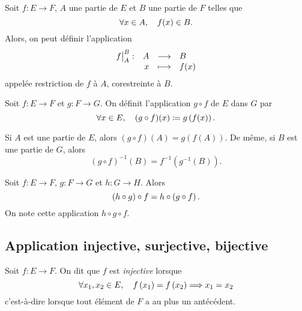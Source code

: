\documentclass{magnolia}
\begin{document}
\begin{remarqueUnique}
\remarque Soit $f:E\to F$, $A$ une partie de $E$ et $B$ une partie de $F$
  telles que
  \[\forall x\in A,\quad f(x)\in B.\]
  Alors, on peut définir l'application
  \[\dspappli{\restricorestri{f}{A}{B}}{A}{B}{x}{f(x)}\]
  appelée restriction de $f$ à $A$, corestreinte à $B$.
\end{remarqueUnique}



\begin{definition}[utile=-3]
Soit $f:E\to F$ et $g:F\to G$. On définit l'application $g\circ f$ de $E$ dans $G$ par
\[\forall x\in E,\quad (g\circ f)(x)\coloneqq g\left(f(x)\right).\]
\end{definition}

\begin{remarqueUnique}
\remarque Si $A$ est une partie de $E$, alors $(g\circ f)(A)=g(f(A))$. De même, si
  $B$ est une partie de $G$, alors \[(g\circ f)^{-1}(B)=f^{-1}(g^{-1}(B)).\]
\end{remarqueUnique}


\begin{proposition}[utile=-3]
Soit $f:E\to F$, $g:F\to G$ et $h:G\to H$. Alors
\[\left(h\circ g\right)\circ f=h\circ\left(g\circ f\right).\]
On note cette application $h\circ g\circ f$.
\end{proposition}

\subsection{Application injective, surjective, bijective}

\begin{definition}[utile=-3]
Soit $f:E\to F$. On dit que $f$ est \emph{injective} lorsque
\[\forall x_1,x_2\in E ,\quad f\left(x_1\right)=f\left(x_2\right) \Longrightarrow x_1=x_2\]
c'est-à-dire lorsque tout élément de $F$ a au plus un antécédent.
\end{definition}
\end{document}
